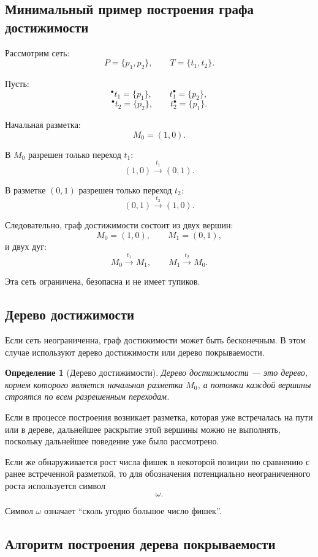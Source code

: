 \documentclass[12pt,a4paper]{article}
\newtheorem{definition}{Определение}
\begin{document}
\subsection{Минимальный пример построения графа достижимости}

Рассмотрим сеть:
\[
P = \{p_1,p_2\},
\qquad
T = \{t_1,t_2\}.
\]

Пусть:
\[
{}^\bullet t_1 = \{p_1\},
\qquad
t_1^\bullet = \{p_2\},
\]
\[
{}^\bullet t_2 = \{p_2\},
\qquad
t_2^\bullet = \{p_1\}.
\]

Начальная разметка:
\[
M_0 = (1,0).
\]

В $M_0$ разрешен только переход $t_1$:
\[
(1,0) \xrightarrow{t_1} (0,1).
\]

В разметке $(0,1)$ разрешен только переход $t_2$:
\[
(0,1) \xrightarrow{t_2} (1,0).
\]

Следовательно, граф достижимости состоит из двух вершин:
\[
M_0=(1,0),
\qquad
M_1=(0,1),
\]
и двух дуг:
\[
M_0 \xrightarrow{t_1} M_1,
\qquad
M_1 \xrightarrow{t_2} M_0.
\]

Эта сеть ограничена, безопасна и не имеет тупиков.

\subsection{Дерево достижимости}

Если сеть неограниченна, граф достижимости может быть бесконечным. В этом случае используют дерево достижимости или дерево покрываемости.

\begin{definition}[Дерево достижимости]
Дерево достижимости --- это дерево, корнем которого является начальная разметка $M_0$, а потомки каждой вершины строятся по всем разрешенным переходам.
\end{definition}

Если в процессе построения возникает разметка, которая уже встречалась на пути или в дереве, дальнейшее раскрытие этой вершины можно не выполнять, поскольку дальнейшее поведение уже было рассмотрено.

Если же обнаруживается рост числа фишек в некоторой позиции по сравнению с ранее встреченной разметкой, то для обозначения потенциально неограниченного роста используется символ
\[
\omega.
\]

Символ $\omega$ означает ``сколь угодно большое число фишек''.

\subsection{Алгоритм построения дерева покрываемости}
\end{document}
